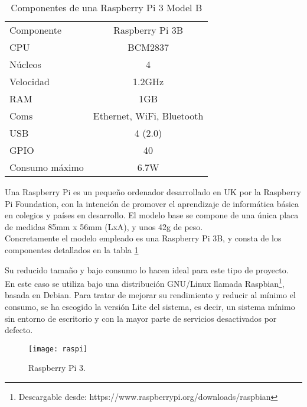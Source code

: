 \begin{table}[H]
	\begin{center}
		\begin{tabular}{l | c}\hline
			\toprule
			Componente & Raspberry Pi 3B\\
			\otoprule
			CPU & BCM2837\\
			Núcleos & 4\\
			Velocidad & 1.2GHz\\
			RAM & 1GB\\
			Coms & Ethernet, WiFi, Bluetooth\\
			USB & 4 (2.0)\\
			GPIO & 40\\
			Consumo máximo & 6.7W\\
			\bottomrule
		\end{tabular}
		\caption{Componentes de una Raspberry Pi 3 Model B}
		\label{tb:raspi3hardware}
	\end{center}
\end{table}

\noindent Una Raspberry Pi es un pequeño ordenador desarrollado en UK por la Raspberry Pi Foundation, con la intención de promover el aprendizaje de informática básica en colegios y países en desarrollo. El modelo base se compone de una única placa de medidas 85mm x 56mm (LxA), y unos 42g de peso.\\Concretamente el modelo empleado es una Raspberry Pi 3B, y consta de los componentes detallados en la tabla \ref{tb:raspi3hardware}



\noindent Su reducido tamaño y bajo consumo lo hacen ideal para este tipo de proyecto. \\En este caso se utiliza bajo una distribución GNU/Linux llamada Raspbian\footnote{Descargable desde: https://www.raspberrypi.org/downloads/raspbian}, basada en Debian. Para tratar de mejorar su rendimiento y reducir al mínimo el consumo, se ha escogido la versión Lite del sistema, es decir, un sistema mínimo sin entorno de escritorio y con la mayor parte de servicios desactivados por defecto.

\begin{figure}
	\centering
	\texttt{[image: raspi]}
	\caption{Raspberry Pi 3.}\label{fig:raspi3b}
\end{figure}

